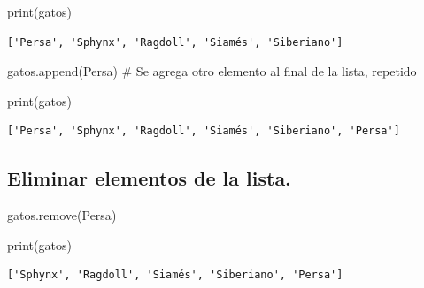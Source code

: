 \documentclass[
  spanish,
  letterpaper,
]{scrbook}
\newenvironment{Shaded}{\begin{snugshade}}{\end{snugshade}}
\newcommand{\BuiltInTok}[1]{\textcolor[rgb]{0.00,0.23,0.31}{#1}}
\newcommand{\CommentTok}[1]{\textcolor[rgb]{0.37,0.37,0.37}{#1}}
\newcommand{\NormalTok}[1]{\textcolor[rgb]{0.00,0.23,0.31}{#1}}
\newcommand{\StringTok}[1]{\textcolor[rgb]{0.13,0.47,0.30}{#1}}
\theoremstyle{definition}
\theoremstyle{remark}
\begin{document}
\begin{Shaded}
\begin{Highlighting}[]
\BuiltInTok{print}\NormalTok{(gatos)}
\end{Highlighting}
\end{Shaded}

\begin{verbatim}
['Persa', 'Sphynx', 'Ragdoll', 'Siamés', 'Siberiano']
\end{verbatim}

\begin{Shaded}
\begin{Highlighting}[]
\NormalTok{gatos.append(}\StringTok{\textquotesingle{}Persa\textquotesingle{}}\NormalTok{) }\CommentTok{\# Se agrega otro elemento al final de la lista, repetido}
\end{Highlighting}
\end{Shaded}

\begin{Shaded}
\begin{Highlighting}[]
\BuiltInTok{print}\NormalTok{(gatos)}
\end{Highlighting}
\end{Shaded}

\begin{verbatim}
['Persa', 'Sphynx', 'Ragdoll', 'Siamés', 'Siberiano', 'Persa']
\end{verbatim}

\subsection{Eliminar elementos de la
lista.}\label{eliminar-elementos-de-la-lista.}

\begin{Shaded}
\begin{Highlighting}[]
\NormalTok{gatos.remove(}\StringTok{\textquotesingle{}Persa\textquotesingle{}}\NormalTok{) }
\end{Highlighting}
\end{Shaded}

\begin{Shaded}
\begin{Highlighting}[]
\BuiltInTok{print}\NormalTok{(gatos) }
\end{Highlighting}
\end{Shaded}

\begin{verbatim}
['Sphynx', 'Ragdoll', 'Siamés', 'Siberiano', 'Persa']
\end{verbatim}
\end{document}
